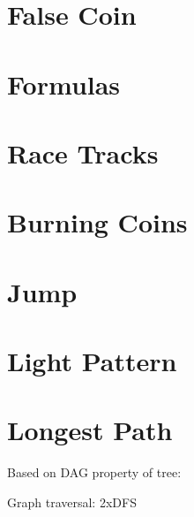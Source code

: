 \documentclass[a4paper, 10pt]{article}
\let\stdsection\section
\renewcommand\section{\newpage\stdsection}
\newcommand{\includecode}[1]{
    }
\begin{document}
    \section{False Coin}
        \includecode{../problems/w02/False_Coin/FalseCoin1.cpp}
        
    \section{Formulas}
        \includecode{../problems/w02/Formulas/Formulas1.cpp}
        
    \section{Race Tracks}
        \includecode{../problems/w02/Race_Tracks/RaceTracks1.cpp}

    
    \section{Burning Coins}
        \includecode{../problems/w03/Burning_Coins/BurningCoin1.cpp}
        
    \section{Jump}
        \includecode{../problems/w03/Jump/Jump1.cpp}
        
    \section{Light Pattern}
        \includecode{../problems/w03/Light_Pattern/LightPatterns1.cpp}
        
    \section{Longest Path}
        Based on DAG property of tree:
        \includecode{../problems/w03/Longest_Path/LongestPath1.cpp}
        
        Graph traversal: 2xDFS
        \includecode{../problems/w03/Longest_Path/LongestPathTraversal1.cpp}
             
              
\end{document}
